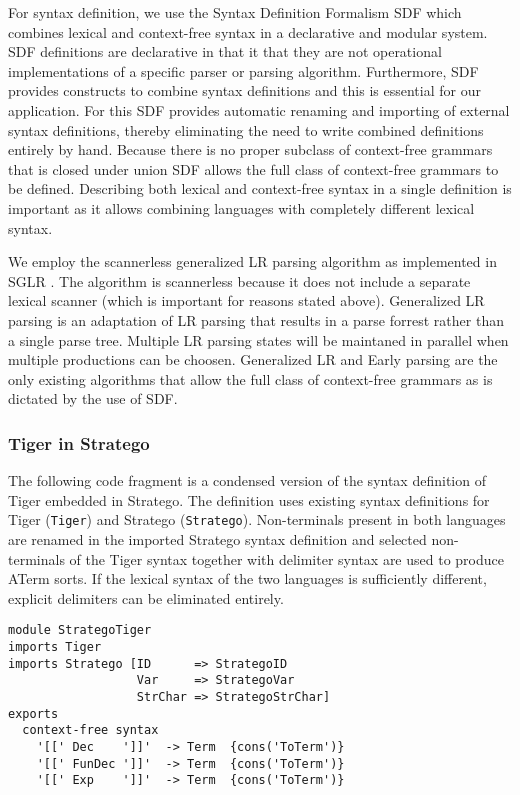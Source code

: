 \documentclass[a4paper,11pt]{article}
\begin{document}
For syntax definition, we use the Syntax Definition Formalism SDF \cite{Brand02, Visser97b} which combines
lexical and context-free syntax in a declarative and modular system. SDF definitions
are declarative in that it that they are not operational implementations of a
specific parser or parsing algorithm. Furthermore, SDF provides constructs to
combine syntax definitions and this is essential for our application. For this SDF
provides automatic renaming and importing of external syntax definitions, thereby
eliminating the need to write combined definitions entirely by hand. Because
there is no proper subclass of context-free grammars that is closed under union
SDF allows the full class of context-free grammars to be defined. Describing
both lexical and context-free syntax in a single definition is important as it
allows combining languages with completely different lexical syntax.

We employ the scannerless generalized LR parsing algorithm as implemented in
SGLR \cite{Visser97}. The algorithm is scannerless because it does not include a separate lexical
scanner (which is important for reasons stated above). Generalized LR parsing is
an adaptation of LR parsing that results in a parse forrest rather than a single
parse tree. Multiple LR parsing states will be maintaned in parallel when multiple
productions can be choosen. Generalized LR and Early parsing are the only existing
algorithms that allow the full class of context-free grammars as is dictated by
the use of SDF.

\subsubsection*{Tiger in Stratego}

The following code fragment is a condensed version of the syntax definition of
Tiger embedded in Stratego. The definition uses existing syntax definitions
for Tiger (\texttt{Tiger}) and Stratego (\texttt{Stratego}). Non-terminals
present in both languages are renamed in the imported Stratego syntax
definition and selected non-terminals of the Tiger syntax together with delimiter
syntax are used to produce ATerm sorts. If the lexical syntax of the two
languages is sufficiently different, explicit delimiters can be eliminated
entirely.

\begin{lstlisting}[title=Combination of syntax definitions of Stratego and Tiger]
module StrategoTiger
imports Tiger
imports Stratego [ID      => StrategoID
                  Var     => StrategoVar
                  StrChar => StrategoStrChar]
exports
  context-free syntax
    '[[' Dec    ']]'  -> Term  {cons('ToTerm')}
    '[[' FunDec ']]'  -> Term  {cons('ToTerm')}
    '[[' Exp    ']]'  -> Term  {cons('ToTerm')}
\end{lstlisting}
\end{document}
